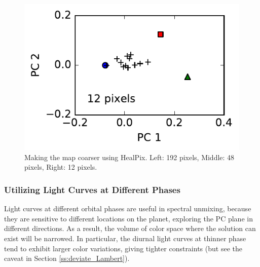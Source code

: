 \documentclass[iop,numberedappendix,apj]{emulateapj}
\begin{document}
\begin{figure}[hbt!]
\begin{minipage}{0.33\hsize}
\begin{center}
\includegraphics[width=\hsize]{IGBP_PCplane_Nside0.pdf}
    \end{center}
     \end{minipage}
    \caption{Making the map coarser using HealPix. Left: 192 pixels, Middle: 48 pixels, Right: 12 pixels. }
\label{fig:lowresolution}
\end{figure}


\subsubsection{Utilizing Light Curves at Different Phases}

Light curves at different orbital phases are useful in spectral unmixing, because they are sensitive to different locations on the planet, exploring the PC plane in different directions. 
As a result, the volume of color space where the solution can exist will be narrowed.  
In particular, the diurnal light curves at thinner phase tend to exhibit larger color variations, giving tighter constraints (but see the caveat in Section \ref{ss:deviate_Lambert}). 
\end{document}
